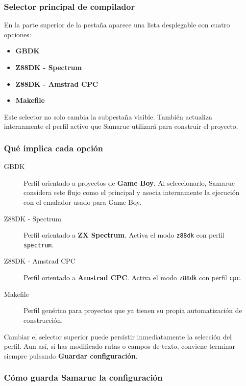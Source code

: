 \documentclass[../../main.tex]{subfiles}
\begin{document}
\subsubsection{Selector principal de compilador}

En la parte superior de la pestaña aparece una lista desplegable con cuatro opciones:

\begin{itemize}
    \item \textbf{GBDK}
    \item \textbf{Z88DK - Spectrum}
    \item \textbf{Z88DK - Amstrad CPC}
    \item \textbf{Makefile}
\end{itemize}

Este selector no solo cambia la subpestaña visible. También actualiza internamente el perfil activo que Samaruc utilizará para construir el proyecto.

\subsubsection{Qué implica cada opción}

\begin{description}
    \item[GBDK] Perfil orientado a proyectos de \textbf{Game Boy}. Al seleccionarlo, Samaruc considera este flujo como el principal y asocia internamente la ejecución con el emulador usado para Game Boy.
    \item[Z88DK - Spectrum] Perfil orientado a \textbf{ZX Spectrum}. Activa el modo \texttt{z88dk} con perfil \texttt{spectrum}.
    \item[Z88DK - Amstrad CPC] Perfil orientado a \textbf{Amstrad CPC}. Activa el modo \texttt{z88dk} con perfil \texttt{cpc}.
    \item[Makefile] Perfil genérico para proyectos que ya tienen su propia automatización de construcción.
\end{description}

Cambiar el selector superior puede persistir inmediatamente la selección del perfil. Aun así, si has modificado rutas o campos de texto, conviene terminar siempre pulsando \textbf{Guardar configuración}.

\subsubsection{Cómo guarda Samaruc la configuración}
\end{document}
